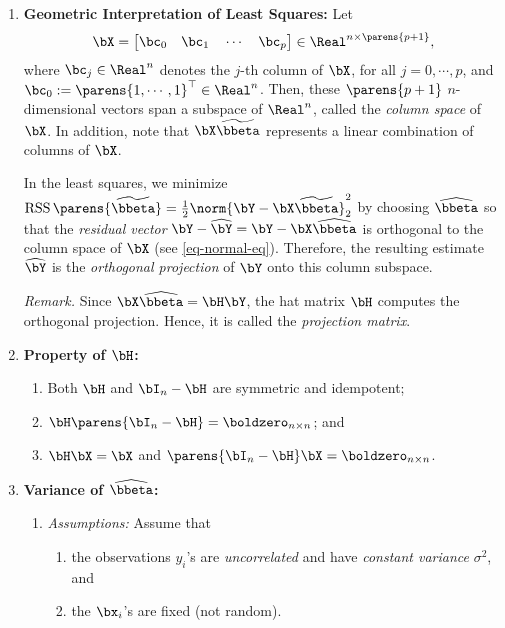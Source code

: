 \documentclass[12pt]{article}
\begin{document}
\begin{enumerate}[label=\textbf{\arabic*.}]
	\item \textbf{Geometric Interpretation of Least Squares:} Let 
	\begin{align*}
		\bX = \begin{bmatrix}
			\bc_0 \hspace{10pt} \bc_1 \hspace{10pt} \cdots \hspace{10pt} \bc_p 
			\end{bmatrix} \in \Real^{n \times \parens{p+1}}, 
	\end{align*}
	where $\bc_j \in \Real^n$ denotes the $j$-th column of $\bX$, for all $j = 0, \cdots, p$, and $\bc_0 := \parens{1, \cdots, 1}^\top \in \Real^n$. Then, these $\parens{p+1}$ $n$-dimensional vectors span a subspace of $\Real^n$, called the \emph{column space} of $\bX$. In addition, note that $\bX \widetilde{\bbeta}$ represents a linear combination of columns of $\bX$. 
	
	In the least squares, we minimize $\mathrm{RSS} \, \parens{\widetilde{\bbeta}} = \frac{1}{2} \norm{\bY - \bX \widetilde{\bbeta}}_2^2$ by choosing $\widehat{\bbeta}$ so that the \textit{residual vector} $\bY - \widehat{\bY} = \bY - \bX \widehat{\bbeta}$ is orthogonal to the column space of $\bX$ (see \eqref{eq-normal-eq}). Therefore, the resulting estimate $\widehat{\bY}$ is the \emph{orthogonal projection} of $\bY$ onto this column subspace. 
	
	\textit{Remark.} Since $\bX \widehat{\bbeta} = \bH \bY$, the hat matrix $\bH$ computes the orthogonal projection. Hence, it is called the \emph{projection matrix}. 
	
	\item \textbf{Property of $\bH$:} 
	\begin{enumerate}
		\item Both $\bH$ and $\bI_n - \bH$ are symmetric and idempotent; 
		\item $\bH \parens{\bI_n - \bH} = \boldzero_{n \times n}$; and 
		\item $\bH \bX = \bX$ and $\parens{\bI_n - \bH} \bX = \boldzero_{n \times n}$. 
	\end{enumerate}
	
	\item \textbf{Variance of $\widehat{\bbeta}$:} 
	\begin{enumerate}
		\item \textit{Assumptions:} Assume that 
		\begin{enumerate}
			\item the observations $y_i$'s are \textit{uncorrelated} and have \textit{constant variance} $\sigma^2$, and 
			\item the $\bx_i$'s are fixed (not random). 
		\end{enumerate}
		

\end{enumerate}
\end{enumerate}
\end{document}
